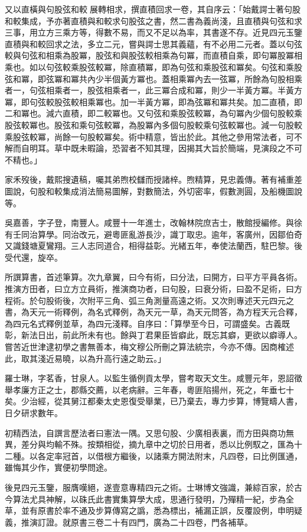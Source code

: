 \begin{pinyinscope}
又以直橫與句股弦和較展轉相求，撰直積回求一卷，其自序云：「始戴諤士著句股和較集成，予亦著直積與和較求句股弦之書，然二書為義尚淺，且直積與句弦和求三事，用立方三乘方等，得數不易，而又不足以為率，其書遂不存。近見四元玉鑒直積與和較回求之法，多立二元，嘗與諤士思其義蘊，有不必用二元者。蓋以句弦較與句弦和相乘為股冪，股弦和與股弦較相乘為句冪，而直積自乘，即句冪股冪相乘也。如以句弦較乘股弦較冪，除直積冪，即為句弦和乘股弦和冪矣。句弦和乘股弦和冪，即弦冪和冪共內少半個黃方冪也。蓋相乘冪內去一弦冪，所餘為句股相乘者一，句弦相乘者一，股弦相乘者一，此三冪合成和冪，則少一半黃方冪。半黃方冪，即句弦較股弦較相乘冪也。加一半黃方冪，即為弦冪和冪共矣。加二直積，即二和冪也。減六直積，即二較冪也。又句弦和乘股弦較冪，為句冪內少個句股較乘股弦較冪也。股弦和乘句弦較冪，為股冪內多個句股較乘句弦較冪也。減一句股較乘股弦較冪，尚餘一句股較冪矣。術中精意，皆出於此。其他之參用常法者，可不解而自明耳。草中既未暇論，恐習者不知其理，因揭其大旨於簡端，見演段之不可不精也。」

家禾歿後，戴熙搜遺稿，囑其弟煦校讎而授諸梓。煦精算，見忠義傳。著有補重差圖說，句股和較集成消法簡易圖解，對數簡法，外切密率，假數測圓，及船機圖說等。

吳嘉善，字子登，南豐人。咸豐十一年進士，改翰林院庶吉士，散館授編修。與徐有壬同治算學。同治改元，避粵匪亂游長沙，識丁取忠。逾年，客廣州，因鄒伯奇又識錢塘夏鸞翔。三人志同道合，相得益彰。光緒五年，奉使法蘭西，駐巴黎。後受代還，旋卒。

所譔算書，首述筆算。次九章翼，曰今有術，曰分法，曰開方，曰平方平員各術。推演方田者，曰立方立員術，推演商功者，曰句股，曰衰分術，曰盈不足術，曰方程術。於句股術後，次附平三角、弧三角測量高遠之術。又次則專述天元四元之書，為天元一術釋例，為名式釋例，為天元一草，為天元問答，為方程天元合釋，為四元名式釋例並草，為四元淺釋。自序曰：「算學至今日，可謂盛矣。古義既彰，新法日出，前此所未有也。餘與丁君果臣皆癖此，既忘其癖，更欲以癖導人。嘗苦近世津逮初學之書無善本，梅文穆公所刪之算法統宗，今亦不傳。因商榷述此，取其淺近易曉，以為升高行遠之助云。」

羅士琳，字茗香，甘泉人。以監生循例貢太學，嘗考取天文生。咸豐元年，恩詔徵舉孝廉方正之士，郡縣交薦，以老病辭。三年春，粵匪陷揚州，死之，年垂七十矣。少治經，從其舅江都秦太史恩復受舉業，已乃棄去，專力步算，博覽疇人書，日夕研求數年。

初精西法，自譔言歷法者曰憲法一隅。又思句股、少廣相表裏，而方田與商功無異，差分與均輸不殊。按類相從，摘九章中之切於日用者，悉以比例馭之，匯為十二種。以各定率冠首，以借根方繼後，以諸乘方開法附末，凡四卷，曰比例匯通，雖悔其少作，實便初學問途。

後見四元玉鑒，服膺嘆絕，遂壹意專精四元之術。士琳博文強識，兼綜百家，於古今算法尤具神解，以硃氏此書實集算學大成，思通行發明，乃殫精一紀，步為全草，並有原書於率不通及步算傳寫之譌，悉為標出，補漏正誤，反覆設例，申明疑義，推演訂證。就原書三卷二十有四門，廣為二十四卷，門各補草。


\end{pinyinscope}
